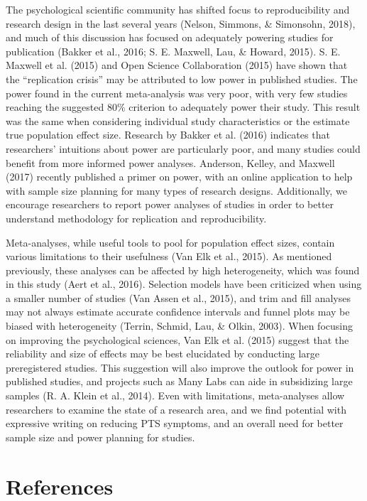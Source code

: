 \documentclass[english,man, mask]{apa6}
\theoremstyle{definition}
\theoremstyle{definition}
\theoremstyle{definition}
\theoremstyle{remark}
\begin{document}
The psychological scientific community has shifted focus to
reproducibility and research design in the last several years (Nelson,
Simmons, \& Simonsohn, 2018), and much of this discussion has focused on
adequately powering studies for publication (Bakker et al., 2016; S. E.
Maxwell, Lau, \& Howard, 2015). S. E. Maxwell et al. (2015) and Open
Science Collaboration (2015) have shown that the \enquote{replication
crisis} may be attributed to low power in published studies. The power
found in the current meta-analysis was very poor, with very few studies
reaching the suggested 80\% criterion to adequately power their study.
This result was the same when considering individual study
characteristics or the estimate true population effect size. Research by
Bakker et al. (2016) indicates that researchers' intuitions about power
are particularly poor, and many studies could benefit from more informed
power analyses. Anderson, Kelley, and Maxwell (2017) recently published
a primer on power, with an online application to help with sample size
planning for many types of research designs. Additionally, we encourage
researchers to report power analyses of studies in order to better
understand methodology for replication and reproducibility.

Meta-analyses, while useful tools to pool for population effect sizes,
contain various limitations to their usefulness (Van Elk et al., 2015).
As mentioned previously, these analyses can be affected by high
heterogeneity, which was found in this study (Aert et al., 2016).
Selection models have been criticized when using a smaller number of
studies (Van Assen et al., 2015), and trim and fill analyses may not
always estimate accurate confidence intervals and funnel plots may be
biased with heterogeneity (Terrin, Schmid, Lau, \& Olkin, 2003). When
focusing on improving the psychological sciences, Van Elk et al. (2015)
suggest that the reliability and size of effects may be best elucidated
by conducting large preregistered studies. This suggestion will also
improve the outlook for power in published studies, and projects such as
Many Labs can aide in subsidizing large samples (R. A. Klein et al.,
2014). Even with limitations, meta-analyses allow researchers to examine
the state of a research area, and we find potential with expressive
writing on reducing PTS symptoms, and an overall need for better sample
size and power planning for studies.

\newpage

\section{References}\label{references}
\end{document}
